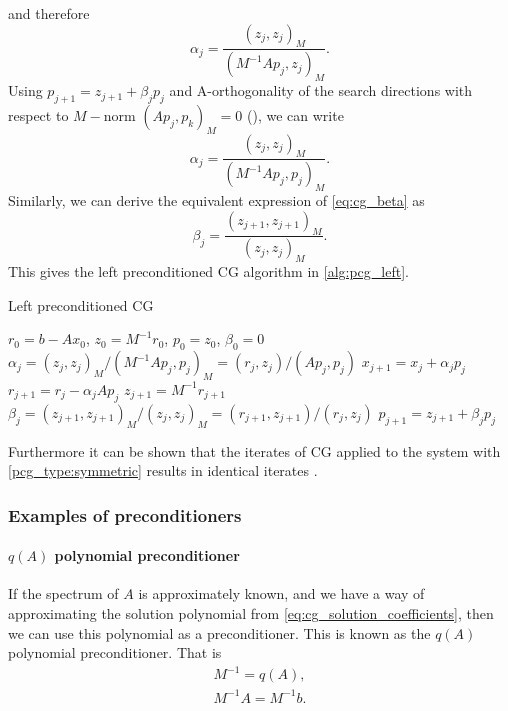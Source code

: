 and therefore
\[
  \alpha_j = \frac{(z_j, z_j)_M}{(M^{-1}Ap_j, z_j)_M}.
\]
Using $p_{j+1} = z_{j+1} + \beta_j p_j$ and A-orthogonality of the search directions with respect to $M-$norm $(Ap_j, p_k)_M = 0$ (), we can write
\[
  \alpha_j = \frac{(z_j, z_j)_M}{(M^{-1}Ap_j, p_j)_M}.
\]
Similarly, we can derive the equivalent expression of \cref{eq:cg_beta} as
\[
  \beta_j = \frac{(z_{j+1}, z_{j+1})_M}{(z_j, z_j)_M}.
\]
This gives the left preconditioned CG algorithm in \cref{alg:pcg_left}.
\begin{algorithm}[H]
  \caption{Left preconditioned CG \cite[Algorithm 9.1]{iter_method_saad}}
  \label{alg:pcg_left}
  \begin{algorithmic}
    \State $r_0 = b - Ax_0$, $z_0 = M^{-1}r_0$, $p_0 = z_0$, $\beta_0 = 0$
    \State $\alpha_j = (z_j, z_j)_M / (M^{-1}Ap_j, p_j)_M = (r_j, z_j) / (Ap_j, p_j)$
    \State $x_{j+1} = x_j + \alpha_j p_j$
    \State $r_{j+1} = r_j - \alpha_j A p_j$
    \State $z_{j+1} = M^{-1}r_{j+1}$
    \State $\beta_j = (z_{j+1}, z_{j+1})_M / (z_j, z_j)_M = (r_{j+1}, z_{j+1}) / (r_j, z_j)$
    \State $p_{j+1} = z_{j+1} + \beta_j p_j$
    \EndFor
  \end{algorithmic}
\end{algorithm}
Furthermore it can be shown that the iterates of CG applied to the system with \cref{pcg_type:symmetric} results in identical iterates \cite[Algorithm 9.2]{iter_method_saad}.

\subsubsection{Examples of preconditioners} \label{sec:cg_preconditioners}
\paragraph{$q(A)$ polynomial preconditioner}
If the spectrum of $A$ is approximately known, and we have a way of approximating the solution polynomial from \cref{eq:cg_solution_coefficients}, then we can use this polynomial as a preconditioner. This is known as the $q(A)$ polynomial preconditioner. That is
\begin{align*}
  M^{-1} = q(A), \\
  M^{-1}A = M^{-1}b.
\end{align*}
